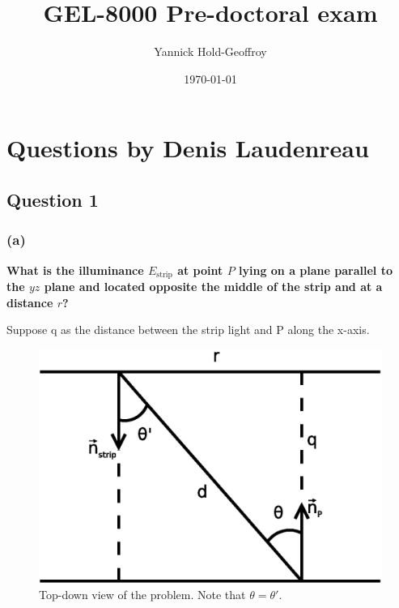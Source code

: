 \documentclass{report}
\title{GEL-8000 Pre-doctoral exam}
\author{Yannick Hold-Geoffroy}
\date{\today}
\begin{document}

\maketitle

\tableofcontents

\hypersetup{colorlinks=true,linkcolor=blue}

\newcommand*\B[1]{\mathbf{#1}}
\newcommand{\boldomega}{\boldsymbol \omega} %
\newcommand{\boldmu}{\boldsymbol \mu} %
\newcommand{\bolddelta}{\boldsymbol \delta} %

\newcommand\norm[1]{\left\lVert#1\right\rVert}

\newcommand\todo[1]{\textcolor{red}{TODO: #1}}

\graphicspath{{figures/}}

\chapter{Questions by Denis Laudenreau}

\section{Question 1}

\subsection{(a)}
\textbf{What is the illuminance $E_{\text{strip}}$ at point $P$ lying on a plane parallel to the $yz$ plane and located opposite the middle of the strip and at a distance $r$?}

Suppose q as the distance between the strip light and P along the x-axis.

\begin{figure}
  \centering
  \includegraphics[width=0.45\linewidth]{q1a_setup.eps}
  \caption[Problem setup]
   {Top-down view of the problem. Note that $\theta = \theta'$.}
  \label{q1a:setup}
\end{figure}
\end{document}
